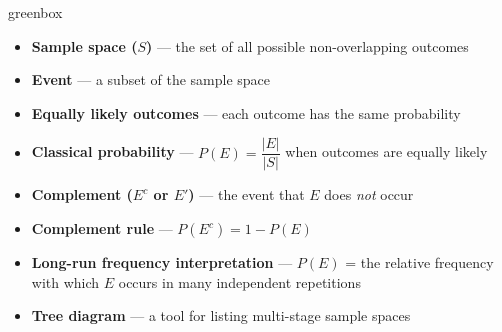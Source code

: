 \documentclass[10pt]{article}
\begin{document}
\begin{skillbox}{greenbox}
\begin{minipage}[t]{0.48\linewidth}
    \begin{itemize}
        \item \textbf{Sample space ($S$)} --- the set of all possible non-overlapping outcomes
        \item \textbf{Event} --- a subset of the sample space
        \item \textbf{Equally likely outcomes} --- each outcome has the same probability
        \item \textbf{Classical probability} ---
              $P(E) = \dfrac{|E|}{|S|}$ when outcomes are equally likely
    \end{itemize}
\end{minipage}
\hfill
\begin{minipage}[t]{0.48\linewidth}
    \begin{itemize}
        \item \textbf{Complement ($E^c$ or $E'$)} --- the event that $E$ does \emph{not} occur
        \item \textbf{Complement rule} --- $P(E^c) = 1 - P(E)$
        \item \textbf{Long-run frequency interpretation} --- $P(E)$ = the relative frequency
              with which $E$ occurs in many independent repetitions
        \item \textbf{Tree diagram} --- a tool for listing multi-stage sample spaces
    \end{itemize}
\end{minipage}
\end{skillbox}
\end{document}
